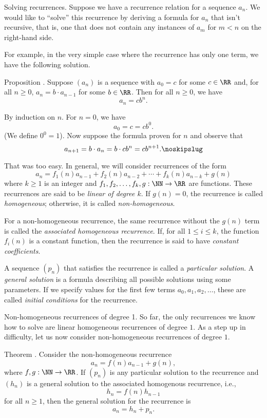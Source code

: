 \medskip\boldlabel Solving recurrences. Suppose we have a recurrence relation for a sequence $a_n$.
We would like to ``solve'' this recurrence by deriving a formula for $a_n$ that isn't recursive,
that is, one that does not contain any instances of $a_m$ for $m<n$ on the right-hand side.

For example, in the very simple case where the recurrence has only one term, we have the following
solution.

\edef\prophomoone{\the\thmcount}
\proclaim Proposition \advthm. Suppose $(a_n)$ is a sequence with $a_0 = c$ for some $c\in \RR$
and, for all $n\ge 0$, $a_n = b\cdot a_{n-1}$ for some $b\in \RR$.
Then for all $n\ge 0$, we have
$$ a_n = c b^n.$$

\proof By induction on $n$. For $n=0$, we have
$$ a_0 = c = cb^0.$$
(We define $0^0 = 1$). Now suppose the formula proven for $n$ and observe that
$$ a_{n+1} = b\cdot a_n = b\cdot cb^n = cb^{n+1}.\noskipslug$$

That was too easy. In general, we will consider recurrences of the form
$$ a_n = f_1(n) a_{n-1} + f_2(n)a_{n-2} + \cdots + f_k(n) a_{n-k} + g(n)$$
where $k\ge 1$ is an integer and $f_1, f_2, \ldots, f_k, g : \NN \to \RR$ are functions.
These recurrences are said to be {\it linear of degree $k$}. If $g(n) = 0$,
the recurrence is called {\it homogeneous}; otherwise, it is called {\it non-homogeneous}.

For a non-homogeneous recurrence, the same recurrence without the $g(n)$ term is called
the {\it associated homogeneous recurrence}.
If, for all $1\le i\le k$, the function $f_i(n)$ is a constant function, then the recurrence
is said to have {\it constant coefficients}.

A sequence $(p_n)$ that satisfies the recurrence is called a {\it particular solution}.
A {\it general solution} is a formula describing all possible solutions using some parameters.
If we specify values for the first few terms $a_0, a_1, a_2,\ldots$, these are called
{\it initial conditions} for the recurrence.

\medskip\boldlabel Non-homogeneous recurrences of degree 1.
So far, the only recurrences we know how to solve are
linear homogeneous recurrences of degree $1$.
As a step up in difficulty, let us now consider non-homogeneous recurrences of degree $1$.

\edef\thmnonhomoone{\the\thmcount}
\proclaim Theorem \advthm. Consider the non-homogeneous recurrence
$$a_n = f(n)a_{n-1} + g(n),$$
where $f,g:\NN\to \RR$. If $(p_n)$ is any particular solution to the recurrence
and $(h_n)$ is a general solution to the associated homogenous recurrence, i.e.,
$$ h_n = f(n) h_{n-1}$$
for all $n\ge 1$, then the general solution for the recurrence is
$$a_n = h_n + p_n.$$

